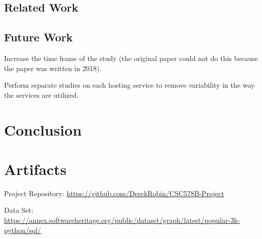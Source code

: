 \documentclass[acmconf]{acmart}
\begin{document}

\subsection{Related Work}

\subsection{Future Work}

Increase the time frame of the study (the original paper could not do this because the paper was written in 2018).

Perform separate studies on each hosting service to remove variability in the way the services are utilized.

\section{Conclusion}




\appendix

\section{Artifacts}
Project Repository: \url{https://github.com/DerekRobin/CSC578B-Project}

Data Set: \url{https://annex.softwareheritage.org/public/dataset/graph/latest/popular-3k-python/sql/}
\end{document}
